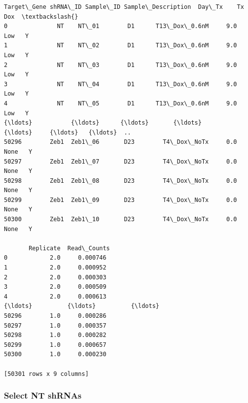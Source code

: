 \documentclass[11pt]{article}
\begin{document}
    
    \begin{Verbatim}[commandchars=\\\{\}]
      Target\_Gene shRNA\_ID Sample\_ID Sample\_Description  Day\_Tx    Tx Dox  \textbackslash{}
0              NT    NT\_01        D1      T13\_Dox\_0.6nM     9.0   Low   Y   
1              NT    NT\_02        D1      T13\_Dox\_0.6nM     9.0   Low   Y   
2              NT    NT\_03        D1      T13\_Dox\_0.6nM     9.0   Low   Y   
3              NT    NT\_04        D1      T13\_Dox\_0.6nM     9.0   Low   Y   
4              NT    NT\_05        D1      T13\_Dox\_0.6nM     9.0   Low   Y   
{\ldots}           {\ldots}      {\ldots}       {\ldots}                {\ldots}     {\ldots}   {\ldots}  ..   
50296        Zeb1  Zeb1\_06       D23        T4\_Dox\_NoTx     0.0  None   Y   
50297        Zeb1  Zeb1\_07       D23        T4\_Dox\_NoTx     0.0  None   Y   
50298        Zeb1  Zeb1\_08       D23        T4\_Dox\_NoTx     0.0  None   Y   
50299        Zeb1  Zeb1\_09       D23        T4\_Dox\_NoTx     0.0  None   Y   
50300        Zeb1  Zeb1\_10       D23        T4\_Dox\_NoTx     0.0  None   Y   

       Replicate  Read\_Counts  
0            2.0     0.000746  
1            2.0     0.000952  
2            2.0     0.000303  
3            2.0     0.000509  
4            2.0     0.000613  
{\ldots}          {\ldots}          {\ldots}  
50296        1.0     0.000286  
50297        1.0     0.000357  
50298        1.0     0.000282  
50299        1.0     0.000657  
50300        1.0     0.000230  

[50301 rows x 9 columns]
    \end{Verbatim}

    
    \subsubsection{Select NT shRNAs}\label{select-nt-shrnas}
\end{document}
